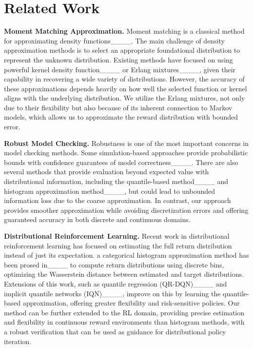 \section{Related Work}
\label{secRelated}
\noindent \textbf{Moment Matching Approximation.} Moment matching is a classical method for approximating density functions____. The main challenge of density approximation methods is to select an appropriate foundational distribution to represent the unknown distribution. Existing methods have focused on using powerful kernel density function____ or Erlang mixtures____, given their capability in recovering a wide variety of distributions. However, the accuracy of these approximations depends heavily on how well the selected function or kernel aligns with the underlying distribution. We utilize the Erlang mixtures, not only due to their flexibility but also because of its inherent connection to Markov models, which allows us to approximate the reward distribution with bounded error.

\vspace{1mm}
\noindent \textbf{Robust Model Checking.} Robustness is one of the most important concerns in model checking methods. Some simulation-based approaches provide probabilistic bounds with confidence guarantees of model correctness____. There are also several methods that provide evaluation beyond expected value with distributional information, including the quantile-based method____ and histogram approximation method____, but could lead to unbounded information loss due to the coarse approximation. In contrast, our approach provides smoother approximation while avoiding discretization errors and offering guaranteed accuracy in both discrete and continuous domains.

\vspace{1mm}
\noindent \textbf{Distributional Reinforcement Learning.} Recent work in distributional reinforcement learning has focused on estimating the full return distribution instead of just its expectation. a categorical histogram approximation method has been prosed in____ to compute return distributions using discrete bins, optimizing the Wasserstein distance between estimated and target distributions. Extensions of this work, such as quantile regression (QR-DQN)____ and implicit quantile networks (IQN)____, improve on this by learning the quantile-based approximation, offering greater flexibility and risk-sensitive policies. Our method can be further extended to the RL domain, providing precise estimation and flexibility in continuous reward environments than histogram methods, with a robust verification that can be used as guidance for distributional policy iteration.
